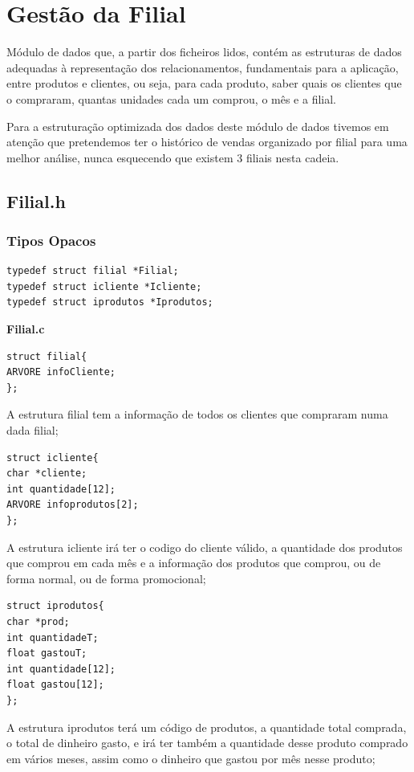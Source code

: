 \section{Gestão da Filial}

Módulo de dados que, a partir dos ficheiros lidos, contém as estruturas de dados adequadas à representação dos relacionamentos, fundamentais para a aplicação, entre produtos e clientes, ou seja, para cada produto, saber quais os clientes que o compraram, quantas unidades cada um comprou, o mês e a filial.

 Para a estruturação optimizada dos dados deste módulo de dados tivemos em atenção que pretendemos ter o histórico de vendas organizado por filial para uma melhor análise, nunca esquecendo que existem 3 filiais nesta cadeia. 

\subsection{Filial.h}

\subsubsection{Tipos Opacos}
\begin{Verbatim}
typedef struct filial *Filial;
typedef struct icliente *Icliente;
typedef struct iprodutos *Iprodutos;
\end{Verbatim}

\textbf{Filial.c}
\begin{verbatim}
struct filial{
ARVORE infoCliente;
};
\end{verbatim}

A estrutura filial tem a informação de todos os clientes que compraram numa dada filial; 

\begin{verbatim}
struct icliente{
char *cliente;
int quantidade[12];
ARVORE infoprodutos[2];
};
\end{verbatim}

A estrutura icliente irá ter o codigo do cliente válido, a quantidade dos produtos que comprou em cada mês e a informação dos produtos que comprou, ou de forma normal, ou de forma promocional; 

\begin{verbatim}
struct iprodutos{
char *prod;
int quantidadeT;
float gastouT;
int quantidade[12];
float gastou[12];
};
\end{verbatim}

A estrutura iprodutos terá um código de produtos, a quantidade total comprada, o total de dinheiro gasto, e irá ter também a quantidade desse produto comprado em vários meses, assim como o dinheiro que gastou por mês nesse produto; 


